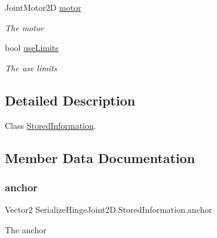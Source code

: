 \begin{DoxyCompactItemize}
Joint\+Motor2D \hyperlink{class_serialize_hinge_joint2_d_1_1_stored_information_a8d32337604a29bf04cc8cf6b65726861}{motor}
\begin{DoxyCompactList}\small\item\em The motor \end{DoxyCompactList}\item 
bool \hyperlink{class_serialize_hinge_joint2_d_1_1_stored_information_ac53602b31e9d63e836d69b84d2dd8596}{use\+Limits}
\begin{DoxyCompactList}\small\item\em The use limits \end{DoxyCompactList}\end{DoxyCompactItemize}


\subsection{Detailed Description}
Class \hyperlink{class_serialize_hinge_joint2_d_1_1_stored_information}{Stored\+Information}. 



\subsection{Member Data Documentation}
\mbox{\label{class_serialize_hinge_joint2_d_1_1_stored_information_a3c4a84445a7c8d7d6f7d3ae85be78b65}} 
\subsubsection{\texorpdfstring{anchor}{anchor}}
{\footnotesize\ttfamily Vector2 Serialize\+Hinge\+Joint2\+D.\+Stored\+Information.\+anchor}



The anchor 

\mbox{\label{class_serialize_hinge_joint2_d_1_1_stored_information_a1f6f75cc7759f5d9556ee62b23e8411d}} 
